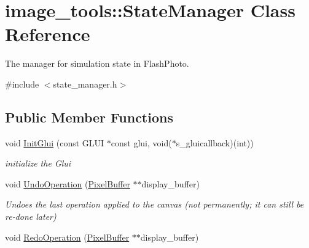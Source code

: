 \hypertarget{classimage__tools_1_1StateManager}{}\section{image\+\_\+tools\+:\+:State\+Manager Class Reference}
\label{classimage__tools_1_1StateManager}


The manager for simulation state in Flash\+Photo.  




{\ttfamily \#include $<$state\+\_\+manager.\+h$>$}

\subsection*{Public Member Functions}
\begin{DoxyCompactItemize}
\item 
void \hyperlink{classimage__tools_1_1StateManager_ac386ffcf7c1c43570ef07e5a67bf01ac}{Init\+Glui} (const G\+L\+UI $\ast$const glui, void($\ast$s\+\_\+gluicallback)(int))\hypertarget{classimage__tools_1_1StateManager_ac386ffcf7c1c43570ef07e5a67bf01ac}{}\label{classimage__tools_1_1StateManager_ac386ffcf7c1c43570ef07e5a67bf01ac}

\begin{DoxyCompactList}\small\item\em initialize the Glui \end{DoxyCompactList}\item 
void \hyperlink{classimage__tools_1_1StateManager_a145acd832974e75bfcf36fde5d346262}{Undo\+Operation} (\hyperlink{classimage__tools_1_1PixelBuffer}{Pixel\+Buffer} $\ast$$\ast$display\+\_\+buffer)\hypertarget{classimage__tools_1_1StateManager_a145acd832974e75bfcf36fde5d346262}{}\label{classimage__tools_1_1StateManager_a145acd832974e75bfcf36fde5d346262}

\begin{DoxyCompactList}\small\item\em Undoes the last operation applied to the canvas (not permanently; it can still be re-\/done later) \end{DoxyCompactList}\item 
void \hyperlink{classimage__tools_1_1StateManager_a7567b735bfaf0cf9075bf85358d23510}{Redo\+Operation} (\hyperlink{classimage__tools_1_1PixelBuffer}{Pixel\+Buffer} $\ast$$\ast$display\+\_\+buffer)\hypertarget{classimage__tools_1_1StateManager_a7567b735bfaf0cf9075bf85358d23510}{}\label{classimage__tools_1_1StateManager_a7567b735bfaf0cf9075bf85358d23510}


\end{DoxyCompactItemize}
